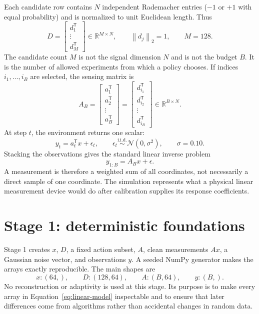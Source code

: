 \documentclass[11pt,a4paper]{article}
\newcommand{\R}{\mathbb{R}}
\newcommand{\norm}[1]{\left\lVert #1\right\rVert}
\newcommand{\trans}{^{\mathsf T}}
\begin{document}
Each candidate row contains $N$ independent Rademacher entries ($-1$ or $+1$ with equal
probability) and is normalized to unit Euclidean length.  Thus
\begin{equation}
D=\begin{bmatrix}d_1\trans\\ \vdots\\ d_M\trans\end{bmatrix}\in\R^{M\times N},
\qquad \norm{d_j}_2=1,
\qquad M=128 .
\label{eq:dictionary}
\end{equation}
The candidate count $M$ is not the signal dimension $N$ and is not the budget $B$.  It is
the number of allowed experiments from which a policy chooses.  If indices
$i_1,\ldots,i_B$ are selected, the sensing matrix is
\begin{equation}
A_B=\begin{bmatrix}a_1\trans\\a_2\trans\\\vdots\\a_B\trans\end{bmatrix}
=\begin{bmatrix}d_{i_1}\trans\\d_{i_2}\trans\\\vdots\\d_{i_B}\trans\end{bmatrix}
\in\R^{B\times N} .
\label{eq:sensing-matrix}
\end{equation}
At step $t$, the environment returns one scalar:
\begin{equation}
y_t=a_t\trans x+\epsilon_t,
\qquad \epsilon_t\stackrel{\text{i.i.d.}}{\sim}\mathcal{N}(0,\sigma^2),
\qquad \sigma=0.10 .
\label{eq:scalar-measurement}
\end{equation}
Stacking the observations gives the standard linear inverse problem
\begin{equation}
y_{1:B}=A_Bx+\epsilon .
\label{eq:linear-model}
\end{equation}
A measurement is therefore a weighted sum of all coordinates, not necessarily a direct
sample of one coordinate.  The simulation represents what a physical linear measurement
device would do after calibration supplies its response coefficients.

\section{Stage 1: deterministic foundations}

Stage 1 creates $x$, $D$, a fixed action subset, $A$, clean measurements $Ax$, a Gaussian
noise vector, and observations $y$.  A seeded NumPy generator makes the arrays exactly
reproducible.  The main shapes are
\begin{equation}
x:(64,),\qquad D:(128,64),\qquad A:(B,64),\qquad y:(B,).
\end{equation}
No reconstruction or adaptivity is used at this stage.  Its purpose is to make every array
in Equation~\eqref{eq:linear-model} inspectable and to ensure that later differences come
from algorithms rather than accidental changes in random data.
\end{document}
